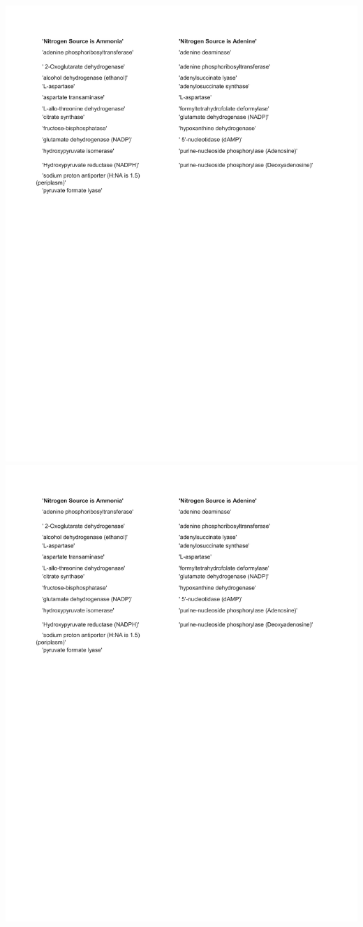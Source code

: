 \documentclass[12pt]{article}
\begin{document}
\includegraphics[page=2]{Figures/SuppInfo/NitrogenSources.pdf}
\newpage
\includegraphics[page=3]{Figures/SuppInfo/NitrogenSources.pdf}
\end{document}
